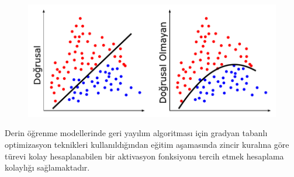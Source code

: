 \begin{figure}[h!]
	\begin{center}
		\vspace{0.4cm}
		{
			\includegraphics[scale=0.64]{Yapilan-Calismalar/Figures/lineer_nonlineer.pdf}
		}
	\end{center}
\end{figure}

Derin öğrenme modellerinde geri yayılım algoritması için gradyan tabanlı optimizasyon teknikleri kullanıldığından eğitim aşamasında zincir kuralına göre türevi kolay hesaplanabilen bir aktivasyon fonksiyonu tercih etmek hesaplama kolaylığı sağlamaktadır.
\vspace{0.2cm}

